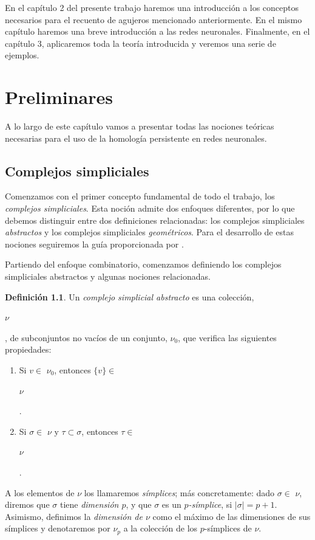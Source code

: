 \documentclass[12pt, a4paper, twoside]{book}
\numberwithin{equation}{section}
\theoremstyle{definition}
\newtheorem{defi}{Definición}[section]
\theoremstyle{remark}
\theoremstyle{plain}
\begin{document}
	En el capítulo 2 del presente trabajo haremos una introducción a los 
	conceptos necesarios para el recuento de agujeros mencionado 
	anteriormente. En el mismo capítulo haremos una breve introducción a 
	las redes neuronales. Finalmente, en el capítulo 3, aplicaremos toda
	la teoría introducida y veremos una serie de ejemplos.
	
	\chapter{Preliminares}

	A lo largo de este capítulo vamos a presentar todas las nociones teóricas 
	necesarias para el uso de la homología persistente en redes neuronales.	
	
	\section{Complejos simpliciales}
	Comenzamos con el primer concepto fundamental de todo el trabajo, los 
	\emph{complejos simpliciales}. Esta noción admite dos enfoques 
	diferentes, por lo que debemos distinguir entre dos definiciones 
	relacionadas: los complejos simpliciales \emph{abstractos} y los 
	complejos simpliciales \emph{geométricos}. Para el desarrollo de estas 
	nociones seguiremos la guía proporcionada por 
	\cite{TopoAlg-Edelsbrunner,Intro-Otter}.

	Partiendo del enfoque combinatorio, comenzamos definiendo los complejos 
	simpliciales abstractos y algunas nociones relacionadas. 

	\begin{defi}
	
	Un \textit{complejo simplicial abstracto} es una colección, 
	\begin{Large}$\nu$\end{Large}, de subconjuntos no vacíos de un 
	conjunto, {\Large $\nu$}$_{0}$, que verifica las siguientes 
	propiedades:
	
	\begin{enumerate}
		\item Si $v \in $ {\Large $ \nu$}$_{0}$, entonces $\{v\} \in$
			\begin{Large}$ \nu$\end{Large}.
		\item Si $\sigma \in $ {\Large $ \nu$}$ \text{ y } \tau 
			\subset \sigma$, entonces $ \tau \in $
			\begin{Large}$ \nu$\end{Large}.
	\end{enumerate}
	
	A los elementos de {\Large $\nu$} los llamaremos \textit{símplices};
	más concretamente: dado $\sigma \in $ {\Large $\nu$}, diremos que 
	$\sigma$ tiene \textit{dimensión $p$}, y que $\sigma$ es un 
	\textit{$p$-símplice}, si $|\sigma|=p+1$. Asimismo, definimos la 
	\textit{dimensión de {\Large $\nu$}} como el máximo de las dimensiones 
	de sus símplices y denotaremos por {\Large $\nu$}$_{p}$ a la colección 
	de los $p$-símplices de {\Large $\nu$}.	
	
	\end{defi}
\end{document}

